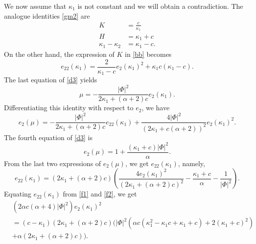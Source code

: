 \documentclass[a4paper,12pt]{amsart}
\theoremstyle{definition}
\begin{document}
 We now assume that $\kappa_1$ is not constant and we will obtain a contradiction. The analogue identities \eqref{gm2} are  
 \begin{equation*}
 \begin{split}
 K&=\frac{c}{\kappa_1}\\
 H&=\kappa_1+c\\
 \kappa_1-\kappa_2&=\kappa_1-c.
 \end{split}
 \end{equation*}
 On the other hand, the expression of $K$ in \eqref{bb} becomes
  \begin{equation}\label{f1}
 e_{22}(\kappa_1)=\frac{2}{\kappa_1-c}e_2(\kappa_1)^2+\kappa_1c(\kappa_1-c).
 \end{equation}
The last equation of \eqref{d3} yields
 \begin{equation}\label{f3}
 \mu=-\frac{|\Phi|^2}{2\kappa_1+(\alpha +2)c}e_2(\kappa_1).
 \end{equation}
 Differentiating this identity with respect to $e_2$, we have
\begin{equation*}
e_2(\mu)=-\frac{|\Phi|^2}{2\kappa_1+(\alpha +2)c}e_{22}(\kappa_1)+\frac{4|\Phi|^2}{(2\kappa_1+c(\alpha +2))^2}e_2(\kappa_1)^2.
\end{equation*}
The fourth equation of \eqref{d3} is
$$e_2(\mu)=1+\frac{(\kappa_1+c)|\Phi|^2}{\alpha}.$$
From the last two expressions of $e_2(\mu)$, we get $e_{22}(\kappa_1)$, namely,  
\begin{equation}\label{f2}
e_{22}(\kappa_1)=(2 \kappa_1+(\alpha +2) c)\left(\frac{4 e_2(\kappa_1)^2}{(2 \kappa_1+(\alpha +2) c)^2} - \frac{\kappa_1+c}{\alpha }-\frac{1}{|\Phi|^2 }\right).
\end{equation}
  Equating $e_{22}(\kappa_1)$ from \eqref{f1} and \eqref{f2}, we get   
\begin{equation}\label{E3}
\begin{split}
&(2 \alpha c (\alpha +4) |\Phi|^2)e_2(\kappa_1)^2\\
&= (c-\kappa_1) (2 \kappa_1+(\alpha +2) c) \Big(|\Phi|^2 \left(\alpha  c \left(\kappa_1^2-\kappa_1 c+\kappa_1+c\right)+2 (\kappa_1+c)^2\right)\\
&+\alpha  (2 \kappa_1+(\alpha +2) c)\Big).
\end{split}
\end{equation}
\end{document}
